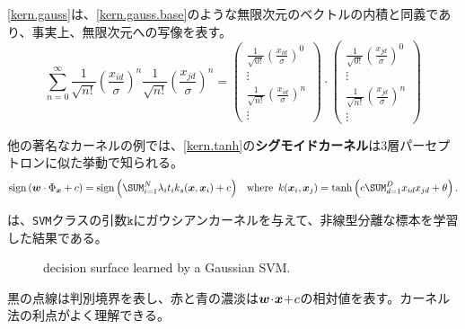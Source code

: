 \documentclass[10pt,a4paper]{book}
\begin{document}
\eqref{kern.gauss}は、\eqref{kern.gauss.base}のような無限次元のベクトルの内積と同義であり、事実上、無限次元への写像を表す。
%
\begin{equation}
\label{eq:kern.gauss.base}
\sum_{n=0}^\infty
\frac{1}{\sqrt{n!}} \left(\frac{x_{id}}{\sigma}\right)^n
\frac{1}{\sqrt{n!}} \left(\frac{x_{jd}}{\sigma}\right)^n =
\begin{pmatrix}
\frac{1}{\sqrt{0!}} \left(\frac{x_{id}}{\sigma}\right)^0 \\
\vdots \\
\frac{1}{\sqrt{n!}} \left(\frac{x_{id}}{\sigma}\right)^n \\
\vdots
\end{pmatrix}
\cdot
\begin{pmatrix}
\frac{1}{\sqrt{0!}} \left(\frac{x_{jd}}{\sigma}\right)^0 \\
\vdots \\
\frac{1}{\sqrt{n!}} \left(\frac{x_{jd}}{\sigma}\right)^n \\
\vdots
\end{pmatrix}
\end{equation}

他の著名なカーネルの例では、\eqref{kern.tanh}の\textbf{シグモイドカーネル}は3層パーセプトロンに似た挙動で知られる。
%
\begin{equation}
\label{eq:kern.tanh}
\mathrm{sign}\left(\dprod{\bm{w}}{\Phiz} + c\right) = \mathrm{sign}\left(\sum_{i=1}^N \lambda_it_i k_s(\bm{x},\bm{x}_i) + c\right)\;
\where k(\bm{x}_i, \bm{x}_j) = \tanh \left(c \sum_{d=1}^D x_{id} x_{jd} + \theta\right).
\end{equation}

は、\texttt{SVM}クラスの引数$\texttt{k}$にガウシアンカーネルを与えて、非線型分離な標本を学習した結果である。

\begin{figure}[h]
\centering
{}
\caption{decision surface learned by a Gaussian SVM.\label{fig:svm.kern}}
\end{figure}

黒の点線は判別境界を表し、赤と青の濃淡は$\bm{w}\! \cdot \!\bm{x}\!+\!c$の相対値を表す。カーネル法の利点がよく理解できる。
\end{document}

